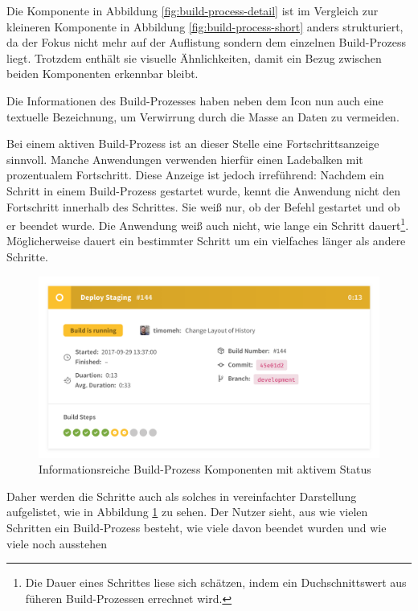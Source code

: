 Die Komponente in Abbildung \ref{fig:build-process-detail} ist im Vergleich zur kleineren Komponente in Abbildung \ref{fig:build-process-short} anders strukturiert, da der Fokus nicht mehr auf der Auflistung sondern dem einzelnen Build-Prozess liegt. Trotzdem enthält sie visuelle Ähnlichkeiten, damit ein Bezug zwischen beiden Komponenten erkennbar bleibt.

Die Informationen des Build-Prozesses haben neben dem Icon nun auch eine textuelle Bezeichnung, um Verwirrung durch die Masse an Daten zu vermeiden.

Bei einem aktiven Build-Prozess ist an dieser Stelle eine Fortschrittsanzeige sinnvoll. Manche Anwendungen verwenden hierfür einen Ladebalken mit prozentualem Fortschritt. Diese Anzeige ist jedoch irreführend: Nachdem ein Schritt in einem Build-Prozess gestartet wurde, kennt die Anwendung nicht den Fortschritt innerhalb des Schrittes. Sie weiß nur, ob der Befehl gestartet und ob er beendet wurde. Die Anwendung weiß auch nicht, wie lange ein Schritt dauert\footnote{Die Dauer eines Schrittes liese sich schätzen, indem ein Duchschnittswert aus füheren Build-Prozessen errechnet wird.}. Möglicherweise dauert ein bestimmter Schritt um ein vielfaches länger als andere Schritte.

\begin{figure}[h]
  \caption{Informationsreiche Build-Prozess Komponenten mit aktivem Status}
  \label{fig:build-process-detail-active}
  \centering
    \includegraphics[width=\textwidth]{assets/build-detail-active}
\end{figure}

Daher werden die Schritte auch als solches in vereinfachter Darstellung aufgelistet, wie in Abbildung \ref{fig:build-process-detail-active} zu sehen. Der Nutzer sieht, aus wie vielen Schritten ein Build-Prozess besteht, wie viele davon beendet wurden und wie viele noch ausstehen

